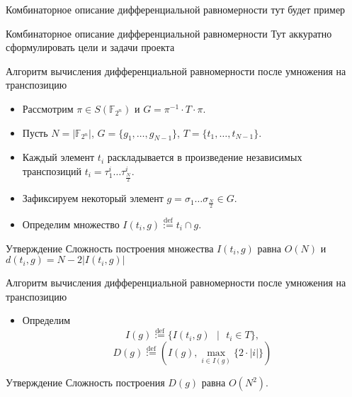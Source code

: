 \documentclass{beamer}
\begin{document}
\begin{frame}{Комбинаторное описание дифференциальной равномерности}
    тут будет пример
\end{frame}







\begin{frame}{Комбинаторное описание дифференциальной равномерности}
Тут аккуратно сформулировать цели и задачи проекта
\end{frame}



\begin{frame}{Алгоритм вычисления дифференциальной равномерности после умножения на транспозицию}
\begin{itemize}
    \item Рассмотрим $\pi \in S(\mathbb{F}_{2^n})$ и $G = \pi^{-1} \cdot T \cdot \pi$.
    \item Пусть $N = |\mathbb{F}_{2^{n}}|$, $G = \{g_{1}, \dots, g_{N - 1}\}$, $T = \{t_{1}, \dots, t_{N - 1}\}$.
    \item Каждый элемент $t_i$ раскладывается в произведение независимых транспозиций $t_i=\tau_1^i \dots \tau_{\frac{N}{2}}^i$.
    \item Зафиксируем некоторый элемент $g = \sigma_{1}\dots\sigma_{\frac{N}{2}} \in G$.
    \item Определим множество $I(t_{i}, g) \stackrel{\text{def}}{:=} t_{i} \cap g$.
\end{itemize}

\begin{block}{Утверждение}
 Сложность построения множества $I(t_i,g)$ равна $O(N)$ и  $d(t_{i}, g) = N - 2 |I(t_{i}, g)|$
\end{block}




\end{frame}

\begin{frame}{Алгоритм вычисления дифференциальной равномерности после умножения на транспозицию}
\begin{itemize}
    \item Определим
$$I(g) \stackrel{\text{def}}{:=} \{I(t_{i}, g) \text{ } | \text{ } t_{i} \in T \},$$
$$D(g) \stackrel{\text{def}}{:=} (I(g), \underset{i \in I(g)}{\max} {\{2 \cdot|i| \}})$$
\end{itemize}

\begin{block}{Утверждение}
 Сложность построения $D(g)$ равна $O(N^{2})$.
\end{block}
\end{frame}
\end{document}
